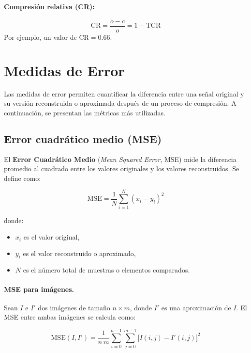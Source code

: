 \documentclass[11pt,a4paper]{article}
\begin{document}
\paragraph{Compresión relativa (CR):}
\begin{equation}
    \mathrm{CR} = \frac{o - c}{o} = 1 - \mathrm{TCR}
\end{equation}
Por ejemplo, un valor de $\mathrm{CR} = 0.66$.

\section{Medidas de Error}

Las medidas de error permiten cuantificar la diferencia entre una señal original y su versión reconstruida o aproximada después de un proceso de compresión. A continuación, se presentan las métricas más utilizadas.

\subsection*{Error cuadrático medio (MSE)}

El \textbf{Error Cuadrático Medio} (\textit{Mean Squared Error}, MSE) mide la diferencia promedio al cuadrado entre los valores originales y los valores reconstruidos. Se define como:

\begin{equation}
    \mathrm{MSE} = \frac{1}{N} \sum_{i=1}^{N} (x_i - y_i)^2
\end{equation}

donde:
\begin{itemize}
    \item $x_i$ es el valor original,
    \item $y_i$ es el valor reconstruido o aproximado,
    \item $N$ es el número total de muestras o elementos comparados.
\end{itemize}

\paragraph{MSE para imágenes.}
Sean $I$ e $I'$ dos imágenes de tamaño $n \times m$, donde $I'$ es una aproximación de $I$. El MSE entre ambas imágenes se calcula como:

\begin{equation}
    \mathrm{MSE}(I, I') = \frac{1}{n \, m} \sum_{i=0}^{n-1} \sum_{j=0}^{m-1} \bigl[ I(i,j) - I'(i,j) \bigr]^2
\end{equation}
\end{document}
